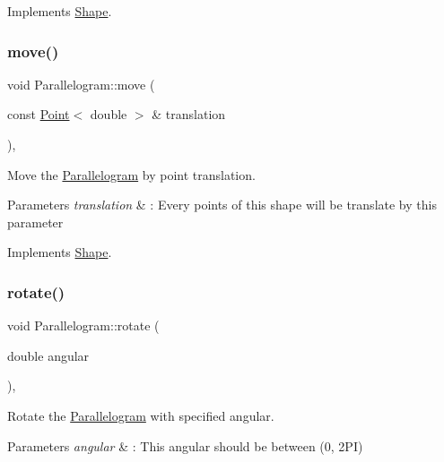 Implements \hyperlink{classShape_aa09a621da090e42840b4bec7ffb27620}{Shape}.

\mbox{\label{classParallelogram_ae8d51f9b629160df31c8a12c28da279e}} 
\subsubsection{\texorpdfstring{move()}{move()}}
{\footnotesize\ttfamily void Parallelogram\+::move (\begin{DoxyParamCaption}\item[{const \hyperlink{classPoint}{Point}$<$ double $>$ \&}]{translation }\end{DoxyParamCaption})\hspace{0.3cm}{\ttfamily [override]}, {\ttfamily [virtual]}}



Move the \hyperlink{classParallelogram}{Parallelogram} by point translation. 


\begin{DoxyParams}{Parameters}
{\em translation} & \+: Every points of this shape will be translate by this parameter \\
\hline
\end{DoxyParams}


Implements \hyperlink{classShape_a1f447acd6219cb10b9b7a40371519c46}{Shape}.

\mbox{\label{classParallelogram_ac498f6a15dea236ecc49bece023d17b0}} 
\subsubsection{\texorpdfstring{rotate()}{rotate()}}
{\footnotesize\ttfamily void Parallelogram\+::rotate (\begin{DoxyParamCaption}\item[{double}]{angular }\end{DoxyParamCaption})\hspace{0.3cm}{\ttfamily [override]}, {\ttfamily [virtual]}}



Rotate the \hyperlink{classParallelogram}{Parallelogram} with specified angular. 


\begin{DoxyParams}{Parameters}
{\em angular} & \+: This angular should be between (0, 2\+PI) \\
\hline
\end{DoxyParams}


